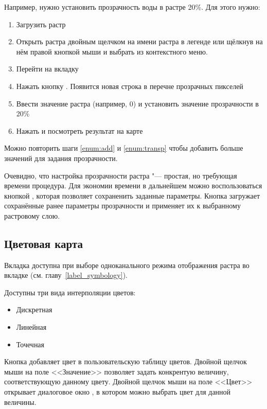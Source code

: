 Например, нужно установить прозрачность воды в растре
 20\%. Для этого нужно:
\begin{enumerate}
 \item Загрузить растр 
 \item Открыть  растра двойным щелчком на имени растра в легенде
 или щёлкнув на нём правой кнопкой мыши и выбрать 
 из контекстного меню.
 \item Перейти на вкладку 
 \item \label{enum:add} Нажать кнопку
 . Появится
 новая строка в перечне прозрачных пикселей
 \item \label{enum:transp} Ввести значение растра (например, 0) и
 установить значение прозрачности в 20\%
 \item Нажать  и посмотреть результат на карте
\end{enumerate}

Можно повторить шаги \ref{enum:add} и \ref{enum:transp} чтобы добавить
больше значений для задания прозрачности.

Очевидно, что настройка прозрачности растра "--- простая, но требующая времени
процедура. Для экономии времени в дальнейшем можно воспользоваться кнопкой
, которая позволяет сохраненить заданные
параметры. Кнопка 
загружает сохранённые ранее параметры прозрачности и применяет их к
выбранному растровому слою.

\subsection{Цветовая карта} \label{label_colormaptab}

Вкладка  доступна при выборе одноканального режима
отображения растра во вкладке  (см. главу~\ref{label_symbology}).

Доступны три вида интерполяции цветов:
\begin{itemize}[label=--]
\item Дискретная
\item Линейная
\item Точечная
\end{itemize}

Кнопка  добавляет цвет в пользовательскую таблицу
цветов. Двойной щелчок мыши на поле <<Значение>>
позволяет задать конкрентую величину, соответствующую данному цвету. Двойной щелчок
мыши на поле <<Цвет>> открывает диалоговое окно , в котором
можно выбрать цвет для данной величины.

